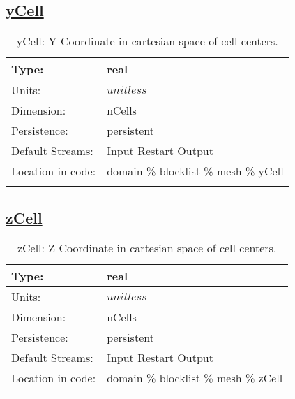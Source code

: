 \subsection[yCell]{\hyperref[sec:var_tab_mesh]{yCell}}
\label{subsec:var_sec_mesh_yCell}
\begin{center}
\begin{longtable}{| p{2.0in} | p{4.0in} |}
        \hline 
        Type: & real \\
        \hline 
        Units: & $unitless$ \\
        \hline 
        Dimension: & nCells \\
        \hline 
        Persistence: & persistent \\
        \hline 
		 Default Streams: & Input Restart Output  \\
        \hline 
		 Location in code: & domain \% blocklist \% mesh \% yCell \\
		 \hline 
    \caption{yCell: Y Coordinate in cartesian space of cell centers.}
\end{longtable}
\end{center}
\subsection[zCell]{\hyperref[sec:var_tab_mesh]{zCell}}
\label{subsec:var_sec_mesh_zCell}
\begin{center}
\begin{longtable}{| p{2.0in} | p{4.0in} |}
        \hline 
        Type: & real \\
        \hline 
        Units: & $unitless$ \\
        \hline 
        Dimension: & nCells \\
        \hline 
        Persistence: & persistent \\
        \hline 
		 Default Streams: & Input Restart Output  \\
        \hline 
		 Location in code: & domain \% blocklist \% mesh \% zCell \\
		 \hline 
    \caption{zCell: Z Coordinate in cartesian space of cell centers.}
\end{longtable}
\end{center}
